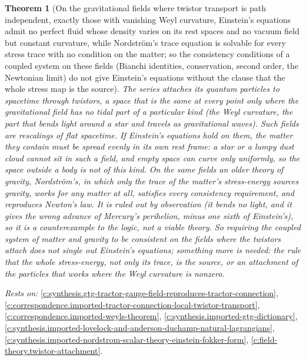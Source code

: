 \documentclass[11pt]{article}
\newtheorem{theorem}{Theorem}[section]
\theoremstyle{definition}
\theoremstyle{plain}
\begin{document}
\begin{theorem}[On the gravitational fields where twistor transport is path independent, exactly those with vanishing Weyl curvature, Einstein's equations admit no perfect fluid whose density varies on its rest spaces and no vacuum field but constant curvature, while Nordstr\"om's trace equation is solvable for every stress trace with no condition on the matter; so the consistency conditions of a coupled system on these fields (Bianchi identities, conservation, second order, the Newtonian limit) do not give Einstein's equations without the clause that the whole stress map is the source]\label{c:synthesis.twistor-flat-fields-give-nordstrom-not-einstein}
The series attaches its quantum particles to spacetime through twistors, a space that is the same at every point only where the gravitational field has no tidal part of a particular kind (the Weyl curvature, the part that bends light around a star and travels as gravitational waves). Such fields are rescalings of flat spacetime. If Einstein's equations hold on them, the matter they contain must be spread evenly in its own rest frame: a star or a lumpy dust cloud cannot sit in such a field, and empty space can curve only uniformly, so the space outside a body is not of this kind. On the same fields an older theory of gravity, Nordstr\"om's, in which only the trace of the matter's stress-energy sources gravity, works for any matter at all, satisfies every consistency requirement, and reproduces Newton's law. It is ruled out by observation (it bends no light, and it gives the wrong advance of Mercury's perihelion, minus one sixth of Einstein's), so it is a counterexample to the logic, not a viable theory. So requiring the coupled system of matter and gravity to be consistent on the fields where the twistors attach does not single out Einstein's equations; something more is needed: the rule that the whole stress-energy, not only its trace, is the source, or an attachment of the particles that works where the Weyl curvature is nonzero.
\end{theorem}
\noindent\emph{Rests on:} \ref{c:synthesis.gtg-tractor-gauge-field-reproduces-tractor-connection}, \ref{c:correspondence.imported-tractor-connection-local-twistor-transport}, \ref{c:correspondence.imported-weyls-theorem}, \ref{c:synthesis.imported-gtg-dictionary}, \ref{c:synthesis.imported-lovelock-and-anderson-duchamp-natural-lagrangians}, \ref{c:synthesis.imported-nordstrom-scalar-theory-einstein-fokker-form}, \ref{c:field-theory.twistor-attachment}.
\end{document}

